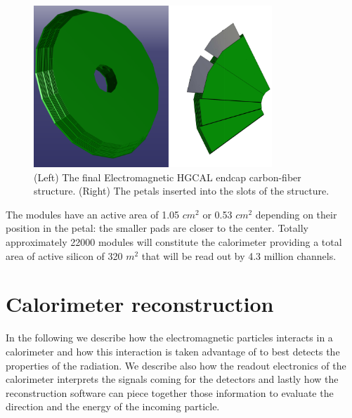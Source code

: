 \begin{figure}
\centerline{\includegraphics[width=0.8\textwidth]{intro/hgcalStruct.png}}
\caption{(Left) The final Electromagnetic HGCAL endcap carbon-fiber structure. (Right) The petals inserted into the slots of the structure.}
\label{hgcalStruct}
\end{figure}

The modules have an active area of 1.05 $\unit{cm^2}$ or 0.53 $\unit{cm^2}$ depending on their position in the petal: the smaller pads are closer to the center. Totally approximately 22000 modules will constitute the calorimeter providing a total area of active silicon of 320 $\unit{m^2}$ that will be read out by 4.3 million channels.\\


\section{Calorimeter reconstruction}\label{sec:hgcal_clustering}
In the following we describe how the electromagnetic particles interacts in a calorimeter and how this interaction is taken advantage of to best detects the properties of the radiation. We describe also how the readout electronics of the calorimeter interprets the signals coming for the detectors and lastly how the reconstruction software can piece together those information to evaluate the direction and the energy of the incoming particle.

